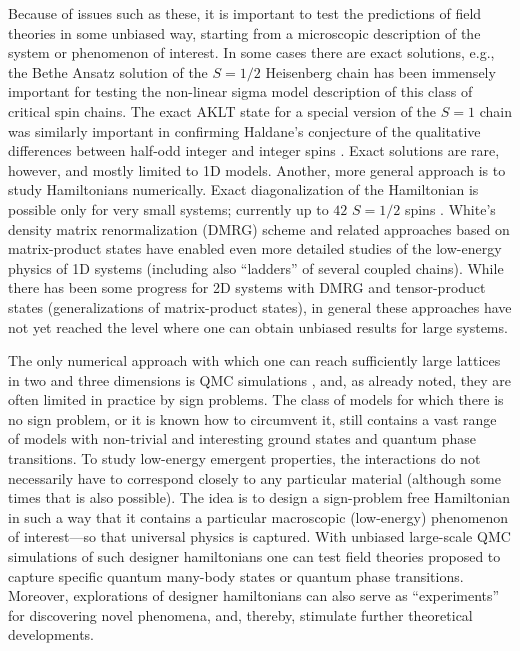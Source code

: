 \documentclass[range]{ar2e}
\begin{document}
Because of issues such as these, it is important to test the predictions of field theories in some unbiased way,
starting from a microscopic description of the system or phenomenon of interest. In some cases there are exact solutions, 
e.g., the Bethe Ansatz solution of the $S=1/2$ Heisenberg chain \cite{Bethe31} has been immensely important for testing 
the non-linear sigma model description of this class of critical spin chains. The exact AKLT state \cite{affleck88} for a special 
version of the $S=1$ chain was similarly important in confirming Haldane's conjecture of the qualitative differences between 
half-odd integer and integer spins \cite{Haldane83}. Exact solutions are rare, however, and mostly limited to 1D models. 
Another, more general approach is to study Hamiltonians numerically. Exact diagonalization of the Hamiltonian is possible 
only for very small systems; currently up to $42$ $S=1/2$ spins \cite{Nakano11,Lauchli11}. White's density matrix 
renormalization (DMRG) scheme \cite{White92} and related approaches based on matrix-product states \cite{Schollwock05} 
have enabled even more detailed studies of the low-energy physics of 1D systems (including also ``ladders'' of several 
coupled chains). While there has been some progress for 2D systems with DMRG \cite{Stoudenmire12} and tensor-product 
\cite{Murg09} states (generalizations of matrix-product states), in general these approaches have not yet reached the 
level where one can obtain unbiased results for large systems.

The only numerical approach with which one can reach sufficiently large lattices in two and three dimensions is QMC 
simulations \cite{Evertz03,Sandvik10b}, and, as already noted, they are often limited in practice by sign problems. The 
class of models for which there is no sign problem, or it is known how to circumvent it, still contains a vast range of 
models with non-trivial and interesting ground states and quantum phase transitions. To study low-energy emergent 
properties, the interactions do not necessarily have to correspond closely to any particular material (although some 
times that is also possible). The idea is to design a sign-problem free Hamiltonian in such a way that it contains a 
particular macroscopic (low-energy) phenomenon of interest---so that universal physics is captured. With unbiased large-scale 
QMC simulations of such designer hamiltonians one can test field theories proposed to capture specific quantum many-body 
states or quantum phase transitions. Moreover, explorations of designer hamiltonians can also serve as ``experiments'' 
for discovering novel phenomena, and, thereby, stimulate further theoretical developments.
\end{document}
